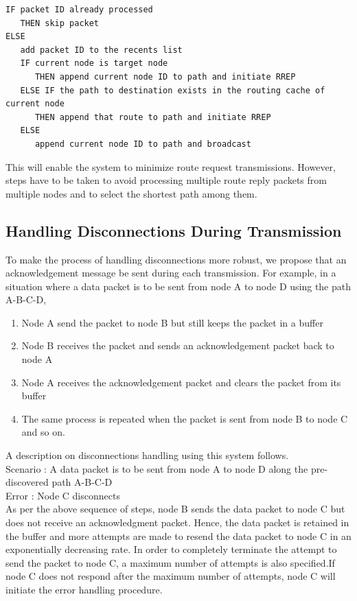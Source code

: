 \documentclass[a4paper,11pt]{article}%
\begin{document}
\begin{verbatim}
IF packet ID already processed
   THEN skip packet
ELSE
   add packet ID to the recents list
   IF current node is target node
      THEN append current node ID to path and initiate RREP
   ELSE IF the path to destination exists in the routing cache of current node
      THEN append that route to path and initiate RREP
   ELSE
      append current node ID to path and broadcast
\end{verbatim}

This will enable the system to minimize route request transmissions.
However, steps have to be taken to avoid processing multiple route reply packets from multiple nodes and to select the shortest path among them.

\subsection{Handling Disconnections During Transmission}


To make the process of handling disconnections more robust, we propose that an acknowledgement message be sent during each transmission. For example, in a situation where a data packet is to be sent from node A to node D using the path A-B-C-D,
\begin{enumerate}[1.]
	\item Node A send the packet to node B but still keeps the packet in a buffer
	\item Node B receives the packet and sends an acknowledgement packet back to node A
	\item Node A receives the acknowledgement packet and clears the packet from its buffer
	\item The same process is repeated when the packet is sent from node B to node C and so on.
\end{enumerate}

A description on disconnections handling using this system follows.\\

Scenario : A data packet is to be sent from node A to node D along the pre-discovered path A-B-C-D\\
Error 	: Node C disconnects\\

As per the above sequence of steps, node B sends the data packet to node C but does not receive an acknowledgment packet. Hence, the data packet is retained in the buffer and more attempts are made to resend the data packet to node C in an exponentially decreasing rate. In order to completely terminate the attempt to send the packet to node C, a maximum number of attempts is also specified.If node C does not respond after the maximum number of attempts, node C will initiate the error handling procedure.\\
\end{document}
